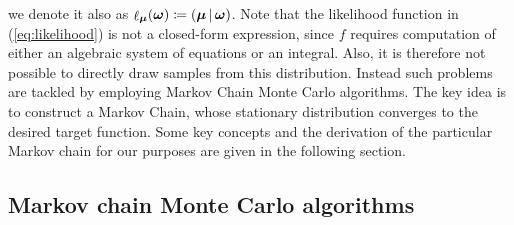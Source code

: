 \documentclass[10pt]{article}
\let\Pr\relax
\DeclareMathOperator\Pr{\mathbb{P}}
\DeclareMathOperator\likeli{\ell}
\DeclareMathOperator\bmu{\boldsymbol{\mu}}
\DeclareMathOperator\bomega{\boldsymbol{\omega}}
\begin{document}
we denote it also as $\likeli_{\bmu}(\bomega) \coloneqq \Pr(\bmu|\bomega)$.
Note that the likelihood function in (\ref{eq:likelihood}) is not a closed-form expression, 
since $f$ requires computation of either an algebraic system of equations or an integral.
Also, it is therefore not possible to directly draw samples from this distribution. 
Instead such problems are tackled by employing Markov Chain Monte Carlo algorithms.
The key idea is to construct a Markov Chain, whose stationary distribution converges to the desired target function.
Some key concepts and the derivation of the particular Markov chain for our purposes are given in the following section.

\subsection{Markov chain Monte Carlo algorithms}
\end{document}
